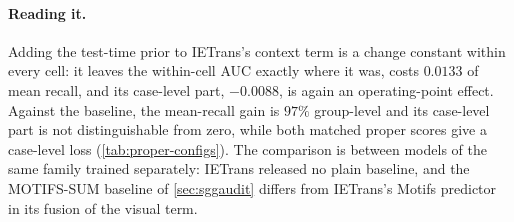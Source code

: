\begin{table}[h]
\centering\footnotesize
\caption{Mean-recall split of the IETrans checkpoint against the MOTIFS baseline (with
tiers), the logit-adjusted baseline, TDE, and itself without the test-time prior. The
proper-score rows are in \cref{tab:proper-configs}, the AUC rows in \cref{tab:recall-auc}.}
\label{tab:ietrans-split}

\end{table}

\paragraph{Reading it.} Adding the test-time prior to IETrans's context term is a change
constant within every cell: it leaves the within-cell AUC exactly where it was, costs
$0.0133$ of mean recall, and its case-level part, $-0.0088$, is again an operating-point
effect. Against the baseline, the mean-recall gain is $97\%$ group-level and its case-level
part is not distinguishable from zero, while both matched proper scores give a case-level
loss (\cref{tab:proper-configs}). The comparison is between models of the same family trained
separately: IETrans released no plain baseline, and the MOTIFS-SUM baseline of
\cref{sec:sggaudit} differs from IETrans's Motifs predictor in its fusion of the visual
term.
